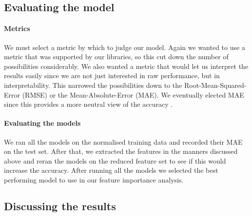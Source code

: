 \documentclass[british]{article}
\begin{document}
	\subsection{Evaluating the model}
	\label{evaluation}
	
	\paragraph{Metrics}We must select a metric by which to judge our model. Again we wanted to use a metric that was supported by our libraries, so this cut down the number of possibilities considerably. We also wanted a metric that would let us interpret the results easily since we are not just interested in raw performance, but in interpretability. This narrowed the possibilities down to the Root-Mean-Squared-Error  (RMSE) or the Mean-Absolute-Error (MAE). We eventually elected MAE since this provides a more neutral view of the accuracy \autocite{Willmott2009}.
	
	\paragraph{Evaluating the models} We ran all the models on the normalised training data and recorded their MAE on the test set. After that, we extracted the features in the manners discussed above and reran the models on the reduced feature set to see if this would increase the accuracy. After running all the models we selected the best performing model to use in our feature importance analysis. 
	
	\subsection{Discussing the results}
	\label{discussion}
	
\end{document}
